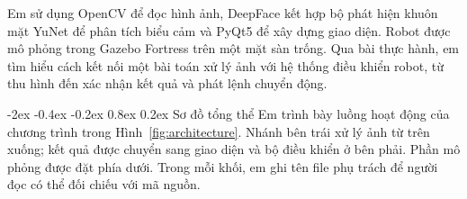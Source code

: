 \documentclass[13pt,a4paper]{extarticle}
\makeatletter
\renewcommand\subsection{\@startsection{subsection}{2}{\z@}%
  {-2ex \@plus -0.4ex \@minus -0.2ex}%
  {0.8ex \@plus 0.2ex}%
  {\normalfont\normalsize\bfseries}}
\makeatother
\begin{document}
Em sử dụng OpenCV để đọc hình ảnh, DeepFace kết hợp bộ phát hiện khuôn mặt YuNet để phân tích biểu cảm và PyQt5 để xây dựng giao diện. Robot được mô phỏng trong Gazebo Fortress trên một mặt sàn trống. Qua bài thực hành, em tìm hiểu cách kết nối một bài toán xử lý ảnh với hệ thống điều khiển robot, từ thu hình đến xác nhận kết quả và phát lệnh chuyển động.

\subsection{Sơ đồ tổng thể}
Em trình bày luồng hoạt động của chương trình trong Hình~\ref{fig:architecture}. Nhánh bên trái xử lý ảnh từ trên xuống; kết quả được chuyển sang giao diện và bộ điều khiển ở bên phải. Phần mô phỏng được đặt phía dưới. Trong mỗi khối, em ghi tên file phụ trách để người đọc có thể đối chiếu với mã nguồn.
\end{document}
